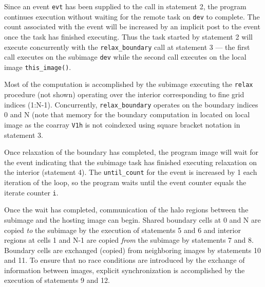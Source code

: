 Since an event \texttt{evt} has been supplied to the call in statement 2, the program
continues execution without waiting for the remote task on \texttt{dev} to complete.  The
count associated with the event will be increased by an implicit post to the event once
the task has finished executing.  Thus the task started by statement 2 will execute
concurrently with the \texttt{relax\_boundary} call at statement 3 --- the first call
executes on the subimage \texttt{dev} while the second call executes on the local image
\texttt{this\_image()}.

Most of the computation is accomplished by the subimage executing the \texttt{relax}
procedure (not shown) operating over the interior corresponding to fine grid indices (1:N-1).
Concurrently, \texttt{relax\_boundary} operates on the boundary indices 0 and N
(note that memory for the boundary computation in located on local image as
the coarray \texttt{V1h} is not coindexed using square bracket notation in statement 3.

Once relaxation of the boundary has completed, the program image will wait for the event
indicating that the subimage task has finished executing relaxation on the interior (statement
4).  The \texttt{until\_count} for the event is increased by 1 each iteration of the loop,
so the program waits until the event counter equals the iterate counter \texttt{i}.

Once the wait has completed, communication of the halo regions between the subimage and
the hosting image can begin.  Shared boundary cells at 0 and N are copied \emph{to} the
subimage by the execution of statements 5 and 6 and interior regions at cells 1 and N-1 are
copied \emph{from} the subimage by statements 7 and 8.  Boundary cells are exchanged (copied)
from neighboring images by statements 10 and 11.  To ensure that no race conditions are
introduced by the exchange of information between images, explicit synchronization is
accomplished by the execution of statements 9 and 12.

